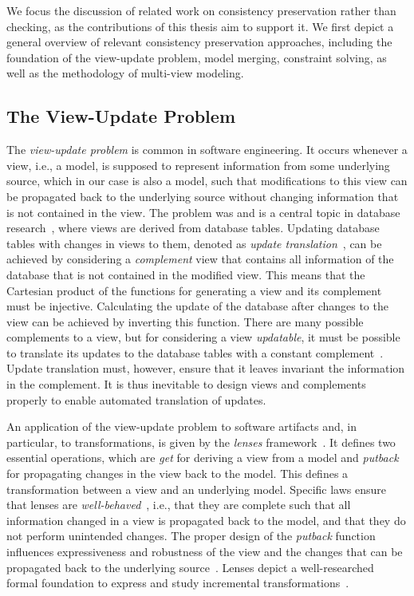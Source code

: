 We focus the discussion of related work on consistency preservation rather than checking, as the contributions of this thesis aim to support it.
We first depict a general overview of relevant consistency preservation approaches, including the foundation of the view-update problem, model merging, constraint solving, as well as the methodology of multi-view modeling.


\subsection{The View-Update Problem}

The \emph{view-update problem} is common in software engineering.
It occurs whenever a view, i.e., a model, is supposed to represent information from some underlying source, which in our case is also a model, such that modifications to this view can be propagated back to the underlying source without changing information that is not contained in the view.
The problem was and is a central topic in database research~\cite{bancilhon1981viewUpdate-TDS, dayal1982viewUpdate-TDS}, where views are derived from database tables.
Updating database tables with changes in views to them, denoted as \emph{update translation}~\cite{bancilhon1981viewUpdate-TDS}, can be achieved by considering a \emph{complement} view that contains all information of the database that is not contained in the modified view.
This means that the Cartesian product of the functions for generating a view and its complement must be injective.
Calculating the update of the database after changes to the view can be achieved by inverting this function.
There are many possible complements to a view, but for considering a view \emph{updatable}, it must be possible to translate its 
updates to the database tables with a constant complement~\cite{bancilhon1981viewUpdate-TDS}.
Update translation must, however, ensure that it leaves invariant the information in the complement.
It is thus inevitable to design views and complements properly to enable automated translation of updates.

An application of the view-update problem to software artifacts and, in particular, to transformations, is given by the \emph{lenses} framework~\cite{foster2005Combinators-POPL, foster2007combinators-TPLS}.
It defines two essential operations, which are \emph{get} for deriving a view from a model and \emph{putback} for propagating changes in the view back to the model.
This defines a transformation between a view and an underlying model.
Specific laws ensure that lenses are \emph{well-behaved}~\cite[Def. 3.2]{foster2007combinators-TPLS}, i.e., that they are complete such that all information changed in a view is propagated back to the model, and that they do not perform unintended changes.
The proper design of the \emph{putback} function influences expressiveness and robustness of the view and the changes that can be propagated back to the underlying source~\cite{foster2007combinators-TPLS}.
Lenses depict a well-researched formal foundation to express and study incremental transformations~\cite{stevens2008bxalgebraic-ICGT}.

